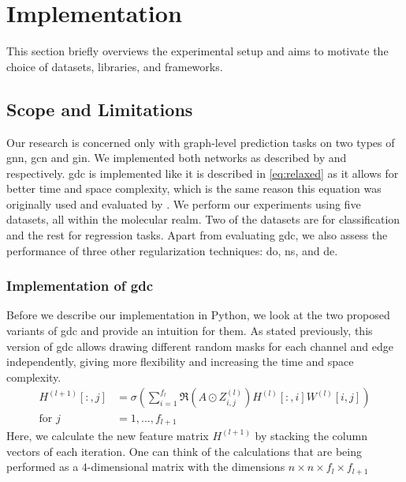 \chapter{Implementation}
\label{sec:implement}
This section briefly overviews the experimental setup and aims to motivate the choice of datasets, libraries, and frameworks.

\section{Scope and Limitations}
\label{sec:implement:scope}
Our research is concerned only with graph-level prediction tasks on two types of \ac{gnn}, \ac{gcn} and \ac{gin}.
We implemented both networks as described by \citet{Kipf2017} and \citet{Xu2019} respectively.
\Ac{gdc} is implemented like it is described in \ref{eq:relaxed} as it allows for better time and space complexity, which is the same reason this equation was originally used and evaluated by \citet{Hasanzadeh2020}. We perform our experiments using five datasets, all within the molecular realm. \cite{Hu2020} Two of the datasets are for classification and the rest for regression tasks. Apart from evaluating \ac{gdc}, we also assess the performance of three other regularization techniques: \ac{do}, \ac{ns}, and \ac{de}.


\subsection{Implementation of \acf{gdc}}
\label{sec:implement:setup:gdc}
\label{sec:implement:gdc}
Before we describe our implementation in Python, we look at the two proposed variants of \ac{gdc} and provide an intuition for them.
As stated previously, this version of \ac{gdc} allows drawing different random masks for each channel and edge independently, giving more flexibility and increasing the time and space complexity.
\begin{equation}
    \begin{aligned}
        H^{(l+1)}[:,j] & = \sigma \left(\sum_{i=1}^{f_{l}}\mathfrak{R}\left(A \odot Z_{i,j}^{(l)}\right)H^{(l)}[:,i]W^{(l)}[i,j]\right) \\
        \text{for } j  & = 1,..., f_{l+1}
    \end{aligned}
\end{equation}
Here, we calculate the new feature matrix $H^{(l+1)}$ by stacking the column vectors of each iteration. One can think of the calculations that are being performed as a $4$-dimensional matrix with the dimensions $n\times n\times f_{l}\times f_{l+1}$

